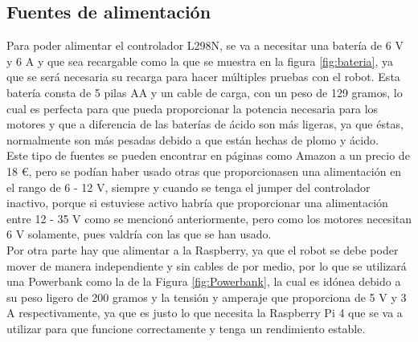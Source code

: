\subsection{Fuentes de alimentación}
\label{subsec:fuentes_alimentacion}

Para poder alimentar el controlador L298N, se va a necesitar una batería de 6 V y 6 A y que sea recargable como la que se muestra en la figura \ref{fig:bateria}, ya que se será necesaria su recarga para hacer múltiples pruebas con el robot. Esta batería consta de 5 pilas AA y un cable de carga, con un peso de 129 gramos, lo cual es perfecta para que pueda proporcionar la potencia necesaria para los motores y que a diferencia de las baterías de ácido son más ligeras, ya que éstas, normalmente son más pesadas debido a que están hechas de plomo y ácido.\\

Este tipo de fuentes se pueden encontrar en páginas como Amazon a un precio de 18 \euro, pero se podían haber usado otras que proporcionasen una alimentación en el rango de 6 - 12 V, siempre y cuando se tenga el jumper del controlador inactivo, porque si estuviese activo habría que proporcionar una alimentación entre 12 - 35 V como se mencionó anteriormente, pero como los motores necesitan 6 V solamente, pues valdría con las que se han usado. \\

Por otra parte hay que alimentar a la Raspberry, ya que el robot se debe poder mover de manera independiente y sin cables de por medio, por lo que se utilizará una Powerbank como la de la Figura \ref{fig:Powerbank}, la cual es idónea debido a su peso ligero de 200 gramos y la tensión y amperaje que proporciona de 5 V y 3 A respectivamente, ya que es justo lo que necesita la Raspberry Pi 4 que se va a utilizar para que funcione correctamente y tenga un rendimiento estable.


